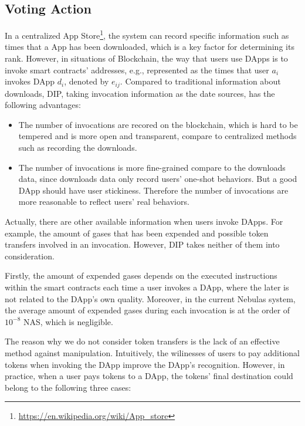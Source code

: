  \subsection{Voting Action}
 \label{subsection:voting}
  In a centralized App Store\footnote{\url{https://en.wikipedia.org/wiki/App\_store}}, the system can record specific information such as times that a App has been downloaded, which is a key factor for determining its rank. However, in situations of Blockchain, the way that users use DApps is to invoke smart contracts' addresses, e.g., represented as the times that user $a_i$ invokes DApp $d_i$, denoted by  $e_{ij}$. Compared to traditional information about downloads, DIP, taking invocation information as the date sources, has the following advantages:

 \begin{itemize}
 	\item The number of invocations are recored on the blockchain, which is hard to be tempered and is more open and transparent, compare to centralized methods such as recording the downloads.
 	\item The number of invocations is more fine-grained compare to the downloads data, since downloads data only record users' one-shot behaviors. But a good DApp should have user stickiness. Therefore the number of invocations are more reasonable to reflect users' real behaviors.

\end{itemize}

 Actually, there are other available information when users invoke DApps. For example, the amount of gases that has been expended and possible token transfers involved in an invocation. However, DIP takes neither of them into consideration.

 Firstly, the amount of expended gases depends on the executed instructions within the smart contracts each time a user invokes a DApp, where the later is not related to the DApp's own quality. Moreover, in the current Nebulas system, the average amount of expended gases during each invocation is at the order of $10^{-8}$ NAS, which is negligible.

 The reason why we do not consider token transfers is the lack of an effective method against manipulation. Intuitively, the wilinesses of users to pay additional tokens when invoking the DApp improve the DApp's recognition.
  However, in practice, when a user pays tokens to a DApp, the tokens' final destination could belong to the following three cases:

